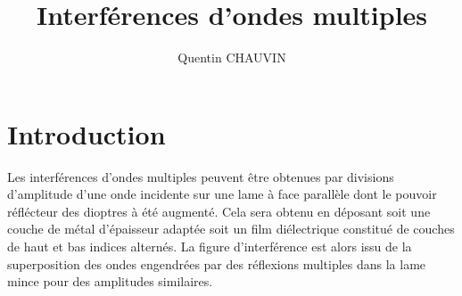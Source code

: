\documentclass[a4paper,12pt]{article}
\title{Interférences d'ondes multiples}
\author{Quentin CHAUVIN}
\theoremstyle{StyleTheo_will}
\theoremstyle{remark}
\begin{document}
\maketitle
\tableofcontents

\section{Introduction}
Les interférences d'ondes multiples peuvent être obtenues par divisions d'amplitude d'une onde incidente sur une lame à face parallèle dont le pouvoir réflécteur des dioptres à été augmenté. Cela sera obtenu en déposant soit une couche de métal d'épaisseur adaptée soit un film diélectrique constitué de couches de haut et bas indices alternés. La figure d'interférence est alors issu de la superposition des ondes engendrées par des réflexions multiples dans la lame mince pour des amplitudes similaires.
\end{document}
